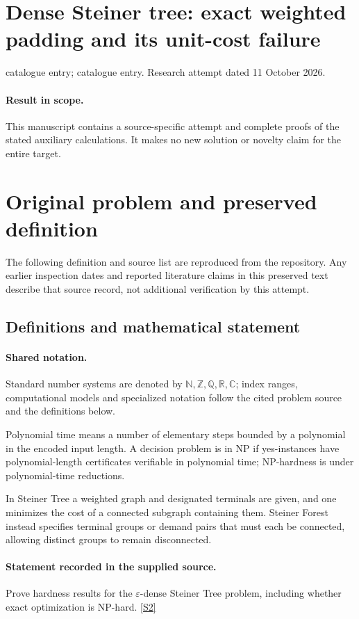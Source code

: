 \documentclass[11pt]{article}
\begin{document}
\section*{Dense Steiner tree: exact weighted padding and its unit-cost failure}
\noindent catalogue entry; catalogue entry. Research attempt dated 11 October 2026.
\paragraph{Result in scope.}This manuscript contains a source-specific attempt and complete proofs of the stated auxiliary calculations. It makes no new solution or novelty claim for the entire target.
\section{Original problem and preserved definition}
The following definition and source list are reproduced from the repository. Any earlier inspection dates and reported literature claims in this preserved text describe that source record, not additional verification by this attempt.
\subsection{Definitions and mathematical statement}

\paragraph{Shared notation.}Standard number systems are denoted by $\mathbb N,\mathbb Z,\mathbb Q,\mathbb R,\mathbb C$; index ranges, computational models and specialized notation follow the cited problem source and the definitions below.


Polynomial time means a number of elementary steps bounded by a polynomial in the encoded input length. A decision problem is in $\mathrm{NP}$ if yes-instances have polynomial-length certificates verifiable in polynomial time; NP-hardness is under polynomial-time reductions.

In Steiner Tree a weighted graph and designated terminals are given, and one minimizes the cost of a connected subgraph containing them. Steiner Forest instead specifies terminal groups or demand pairs that must each be connected, allowing distinct groups to remain disconnected.
\paragraph{Statement recorded in the supplied source.}
Prove hardness results for the $\varepsilon$-dense Steiner Tree problem, including whether exact optimization is NP-hard. \href{https://doi.org/10.4171/owr/2004/28}{[S2]}
\end{document}
